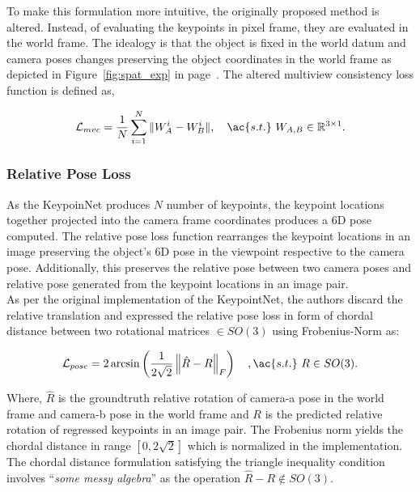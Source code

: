 To make this formulation more intuitive, the originally proposed method is altered. Instead, of evaluating the keypoints in pixel frame, they are evaluated in the world frame.
The idealogy is that the object is fixed in the world datum and camera poses changes preserving the object coordinates in the world frame as depicted in Figure~\ref{fig:spat_exp} in page~\pageref{fig:spat_exp}.
The altered multiview consistency loss function is defined as,

\begin{equation}
    \mathcal{L}_{mvc} = \dfrac{1}{N} \displaystyle\sum^N_{i=1} \| W_A^i - W_B^i\|, \quad \ac{s.t.} \ W_{A, B} \in \mathbb{R}^{3 \times 1}.
\end{equation}





\subsubsection{Relative Pose Loss}

As the KeypoinNet produces $N$ number of keypoints, the keypoint locations together projected into the camera frame coordinates produces a 6D pose computed.
The relative pose loss function rearranges the keypoint locations in an image preserving the object's 6D pose in the viewpoint respective to the camera pose.
Additionally, this preserves the relative pose between two camera poses and relative pose generated from the keypoint locations in an image pair.\\

As per the original implementation of the KeypointNet, the authors discard the relative translation and expressed the relative pose
loss in form of chordal distance between two rotational matrices $ \in SO(3)$ using Frobenius-Norm \cite{bhatia2013matrix} as:

\begin{equation}
    \mathcal{L}_{pose} = 2 \arcsin \left( \dfrac{1}{2\sqrt{2}} \left\Vert \hat{R} - R \right\Vert_F \right) \quad,\ac{s.t.} \ R \in SO(3).
\end{equation}

Where, $\hat{R}$ is the groundtruth relative rotation of camera-a pose in the world frame and camera-b pose in the world frame and $R$ is the predicted relative rotation of regressed keypoints in an image pair.
The Frobenius norm yields the chordal distance in range $[0, 2 \sqrt{2}]$ which is normalized in the implementation.
The chordal distance formulation satisfying the triangle inequality condition involves ``\emph{some messy algebra}'' \cite{huynh2009metrics} as the operation $\hat{R} - R \notin SO(3)$. \\


